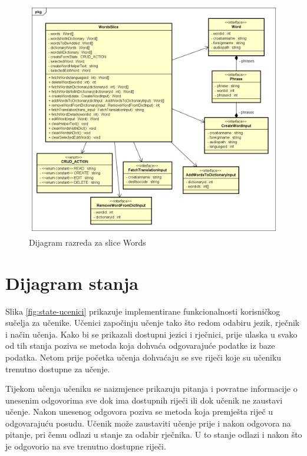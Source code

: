 \begin{figure}[p!]
	\includegraphics[scale=0.5]{dijagrami/WordsSlice.png}
	\centering
	\caption{Dijagram razreda za slice Words}
	\label{fig:cls-words}
\end{figure}

\clearpage

\section{Dijagram stanja}

Slika \ref{fig:state-ucenici} prikazuje implementirane funkcionalnosti korisničkog sučelja za učenike. Učenici započinju učenje tako što redom odabiru jezik, rječnik i način učenja. Kako bi se prikazali dostupni jezici i rječnici, prije ulaska u svako od tih stanja poziva se metoda koja dohvaća odgovarajuće podatke iz baze podatka. Netom prije početka učenja dohvaćaju se sve riječi koje su učeniku trenutno dostupne za učenje.

Tijekom učenja učeniku se naizmjence prikazuju pitanja i povratne informacije o unesenim odgovorima sve dok ima dostupnih riječi ili dok učenik ne zaustavi učenje. Nakon unesenog odgovora poziva se metoda koja premješta riječ u odgovarajuću posudu. Učenik može zaustaviti učenje prije i nakon odgovora na pitanje, pri čemu odlazi u stanje za odabir rječnika. U to stanje odlazi i nakon što je odgovorio na sve trenutno dostupne riječi. 

